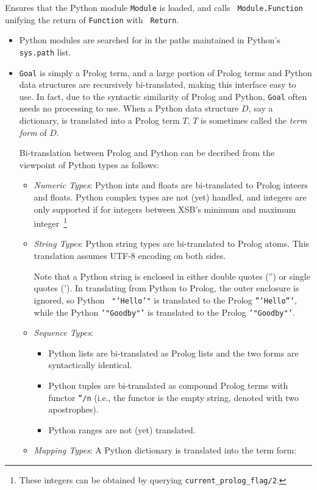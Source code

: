 \begin{description}

%
 Ensures that the Python module {\tt Module} is loaded, and calls {\tt
   Module.Function} unifying the return of {\tt Function} with {\tt
   Return}. 

 \begin{itemize}
   \item Python modules are searched for in the paths maintained in
     Python's {\tt sys.path} list.
   \item {\tt Goal} is simply a Prolog term, and a large portion of
     Prolog terms and Python data structures are recursively
     bi-translated, making this interface easy to use.  In fact, due
     to the syntactic similarity of Prolog and Python, {\tt Goal}
     often needs no processing to use.  When a Python data structure
     $D$, say a dictionary, is translated into a Prolog term $T$, $T$
     is sometimes called the {\em term form} of $D$.

     Bi-translation between Prolog and Python can be decribed from the
     viewpoint of Python types as follows:
     \begin{itemize}
       \item {\em Numeric Types}: Python ints and floats are
         bi-translated to Prolog inteers and floats.  Python complex
         types are not (yet) handled, and integers are only supported
         if for integers between XSB's minimum and maximum
         integer~\footnote{These integers can be obtained by querying
           {\tt current\_prolog\_flag/2}.}
       \item {\em String Types}: Python string types are bi-translated
         to Prolog atoms.  This translation assumes UTF-8 encoding on
         both sides.

         Note that a Python string is enclosed in either double quotes
         ('') or single quotes (').  In translating from Python to
         Prolog, the outer enclosure is ignored, so Python {\tt
           "'Hello'"} is translated to the Prolog {\tt '''Hello'''},
         while the Python {\tt '"Goodby"'} is  translated to the Prolog
         {\tt '"Goodby"'}.
       \item {\em Sequence Types}:
         \begin{itemize}
           \item Python lists are bi-translated as Prolog lists and
             the two forms are syntactically identical.
           \item Python tuples are bi-translated as compound Prolog
             terms with functor {\tt ''/n} (i.e., the functor is the
             empty string, denoted with two apostrophes).
             \item Python ranges are not (yet) translated.
         \end{itemize}
       \item {\em Mapping Types}: A Python dictionary is translated
         into the term form:


\end{itemize}
\end{itemize}
\end{description}
